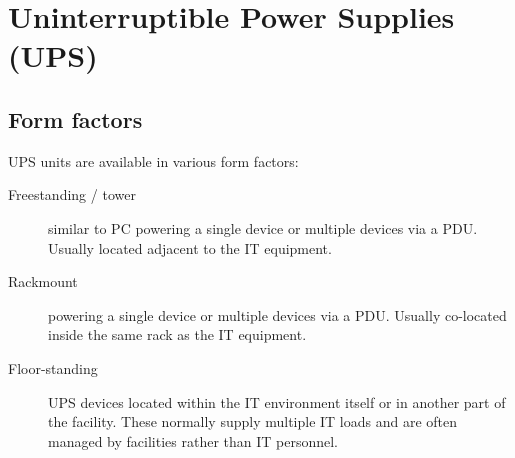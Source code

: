 \documentclass{pgslides}
\begin{document}
\section{Uninterruptible Power Supplies (UPS)}



\subsection{Form factors}

\begin{frame}{\insertsubsectionhead}
UPS units are available in various form factors:
\begin{description}
\item[Freestanding / tower] similar to PC powering a single device or multiple devices via a PDU.  Usually located adjacent to the IT equipment.
\item[Rackmount] powering a single device or multiple devices via a PDU. Usually co-located inside the same rack as the IT equipment.
\item[Floor-standing] UPS devices located within the IT environment itself or in another part of the facility. These normally supply multiple IT loads and are often managed by facilities rather than IT personnel. 
\end{description}
\end{frame}
\end{document}
